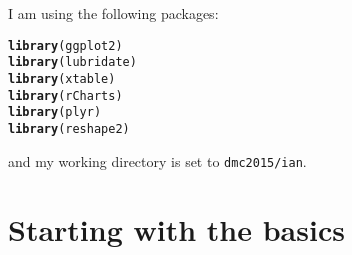 \documentclass[10pt]{report}
\makeatletter
\newcommand{\hlstd}[1]{\textcolor[rgb]{0.345,0.345,0.345}{#1}}%
\newcommand{\hlkwd}[1]{\textcolor[rgb]{0.737,0.353,0.396}{\textbf{#1}}}%
\newenvironment{kframe}{%
 \def\at@end@of@kframe{}%
 \ifinner\ifhmode%
  \def\at@end@of@kframe{\end{minipage}}%
  \begin{minipage}{\columnwidth}%
 \fi\fi%
 \def\FrameCommand##1{\hskip\@totalleftmargin \hskip-\fboxsep
 \colorbox{shadecolor}{##1}\hskip-\fboxsep
     \hskip-\linewidth \hskip-\@totalleftmargin \hskip\columnwidth}%
 \MakeFramed {\advance\hsize-\width
   \@totalleftmargin\z@ \linewidth\hsize
   \@setminipage}}%
 {\par\unskip\endMakeFramed%
 \at@end@of@kframe}
\newenvironment{knitrout}{}{} %
\makeatother
\begin{document}
%


\titleheader

I am using the following packages:
\begin{knitrout}
\color{fgcolor}\begin{kframe}
\begin{alltt}
\hlkwd{library}\hlstd{(ggplot2)}
\hlkwd{library}\hlstd{(lubridate)}
\hlkwd{library}\hlstd{(xtable)}
\hlkwd{library}\hlstd{(rCharts)}
\hlkwd{library}\hlstd{(plyr)}
\hlkwd{library}\hlstd{(reshape2)}
\end{alltt}
\end{kframe}
\end{knitrout}
and my working directory is set to \verb!dmc2015/ian!.

\section{Starting with the basics}
\end{document}

